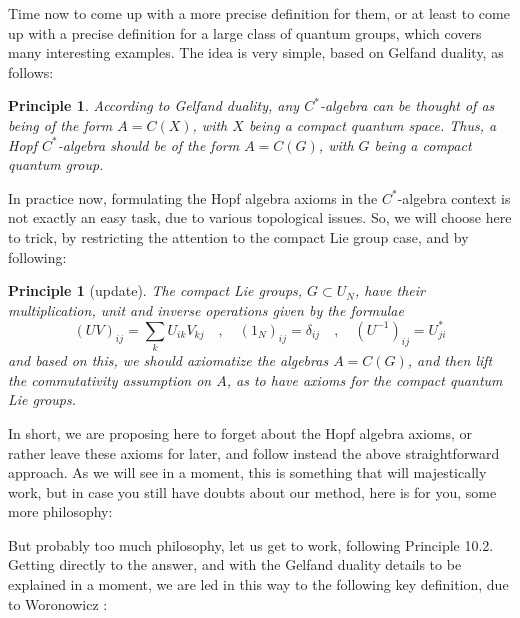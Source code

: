 \documentclass[12pt]{amsbook}
\newtheorem{comment}[theorem]{Comment}
\newtheorem{principle}[theorem]{Principle}
\begin{document}
\bigskip

Time now to come up with a more precise definition for them, or at least to come up with a precise definition for a large class of quantum groups, which covers many interesting examples. The idea is very simple, based on Gelfand duality, as follows:

\begin{principle}
According to Gelfand duality, any $C^*$-algebra can be thought of as being of the form $A=C(X)$, with $X$ being a compact quantum space. Thus, a Hopf $C^*$-algebra should be of the form $A=C(G)$, with $G$ being a compact quantum group.
\end{principle}

In practice now, formulating the Hopf algebra axioms in the $C^*$-algebra context is not exactly an easy task, due to various topological issues. So, we will choose here to trick, by restricting the attention to the compact Lie group case, and by following:

\begin{principle}[update]
The compact Lie groups, $G\subset U_N$, have their multiplication, unit and inverse operations given by the formulae
$$(UV)_{ij}=\sum_kU_{ik}V_{kj}\quad,\quad 
(1_N)_{ij}=\delta_{ij}\quad,\quad 
(U^{-1})_{ij}=U_{ji}^*$$
and based on this, we should axiomatize the algebras $A=C(G)$, and then lift the commutativity assumption on $A$, as to have axioms for the compact quantum Lie groups.
\end{principle}

In short, we are proposing here to forget about the Hopf algebra axioms, or rather leave these axioms for later, and follow instead the above straightforward approach. As we will see in a moment, this is something that will majestically work, but in case you still have doubts about our method, here is for you, some more philosophy:

But probably too much philosophy, let us get to work, following Principle 10.2. Getting directly to the answer, and with the Gelfand duality details to be explained in a moment, we are led in this way to the following key definition, due to Woronowicz \cite{wo1}:

\end{document}
